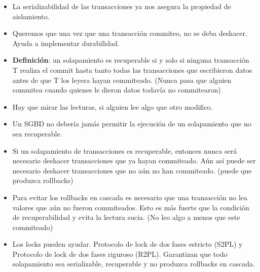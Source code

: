 \begin{itemize}
\item La serializabilidad de las transacciones ya nos asegura la propiedad de aislamiento.
\item Queremos que una vez que una transacción commiteo, no se deba deshacer. Ayuda a implementar durabilidad.
\item \textbf{Definición}: un solapamiento es recuperable si y solo si ninguna transacción T realiza el commit hasta tanto todas las transacciones que escribieron datos antes de que T los leyera hayan commiteado. (Nunca pasa que alguien commitea cuando quienes le dieron datos todavía no commitearon)
\item Hay que mirar las lecturas, si alguien lee algo que otro modifico.
\item Un SGBD no debería jamás permitir la ejecución de un solapamiento que no sea recuperable.
\item Si un solapamiento de transacciones es recuperable, entonces nunca será necesario deshacer transacciones que ya hayan commiteado. Aún así puede ser necesario deshacer transacciones que no aún no han commiteado. (puede que produzca rollbacks)
\item Para evitar los rollbacks en cascada es necesario que una transacción no lea valores que aún no fueron commiteados. Esto es más fuerte que la condición de recuperabilidad y evita la lectura sucia. (No leo algo a menos que este commiteado)
\item Los locks pueden ayudar. Protocolo de lock de dos fases estricto (S2PL) y Protocolo de lock de dos fases riguroso (R2PL). Garantizan que todo solapamiento sea serializable, recuperable y no produzca rollbacks en cascada.
\end{itemize}

\newpage